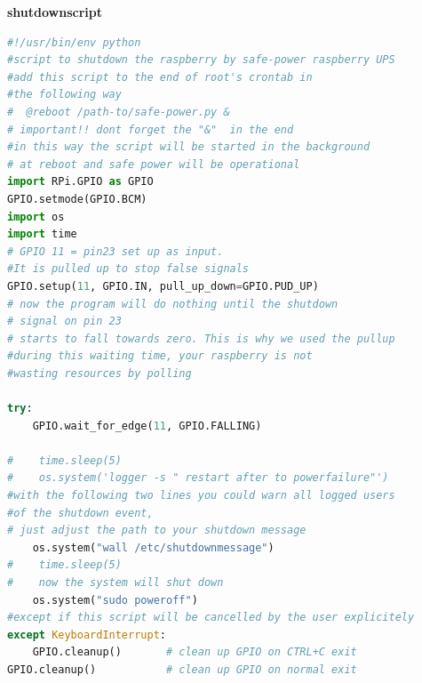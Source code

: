 \documentclass{article}
\begin{document}
\textbf{shutdownscript}


\begin{lstlisting}[language=Python]
#!/usr/bin/env python
#script to shutdown the raspberry by safe-power raspberry UPS
#add this script to the end of root's crontab in 
#the following way
#  @reboot /path-to/safe-power.py &
# important!! dont forget the "&"  in the end
#in this way the script will be started in the background
# at reboot and safe power will be operational
import RPi.GPIO as GPIO
GPIO.setmode(GPIO.BCM)
import os
import time
# GPIO 11 = pin23 set up as input. 
#It is pulled up to stop false signals
GPIO.setup(11, GPIO.IN, pull_up_down=GPIO.PUD_UP)
# now the program will do nothing until the shutdown
# signal on pin 23
# starts to fall towards zero. This is why we used the pullup
#during this waiting time, your raspberry is not
#wasting resources by polling

try:
    GPIO.wait_for_edge(11, GPIO.FALLING)

#    time.sleep(5)
#    os.system('logger -s " restart after to powerfailure"')
#with the following two lines you could warn all logged users 
#of the shutdown event,
# just adjust the path to your shutdown message
    os.system("wall /etc/shutdownmessage")
#    time.sleep(5)
#    now the system will shut down
    os.system("sudo poweroff")
#except if this script will be cancelled by the user explicitely
except KeyboardInterrupt:
    GPIO.cleanup()       # clean up GPIO on CTRL+C exit
GPIO.cleanup()           # clean up GPIO on normal exit
 
\end{lstlisting}
\end{document}
